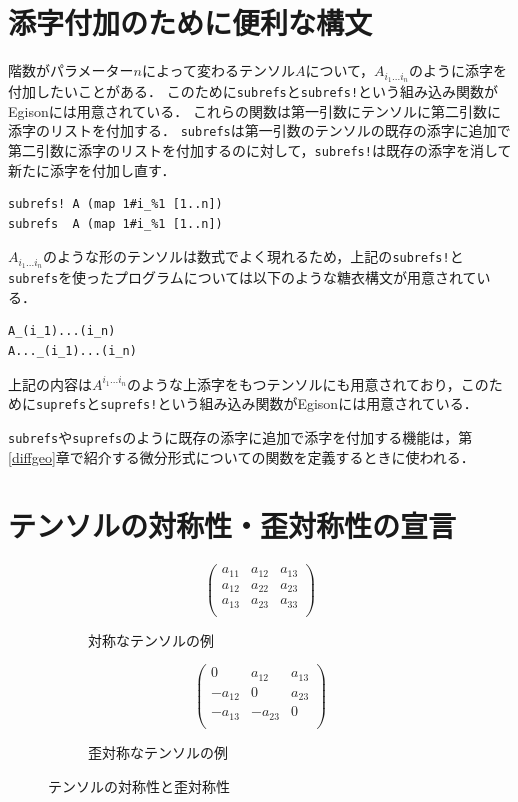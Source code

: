 \section{添字付加のために便利な構文}\label{tensor-refs}

階数がパラメーター$n$によって変わるテンソル$A$について，$A_{i_{1}...i_{n}}$のように添字を付加したいことがある．
このために\lstinline{subrefs}と\lstinline{subrefs!}という組み込み関数がEgisonには用意されている．
これらの関数は第一引数にテンソルに第二引数に添字のリストを付加する．
\lstinline{subrefs}は第一引数のテンソルの既存の添字に追加で第二引数に添字のリストを付加するのに対して，\lstinline{subrefs!}は既存の添字を消して新たに添字を付加し直す．
\begin{lstlisting}[language=egison,numbers=none]
subrefs! A (map 1#i_%1 [1..n])
subrefs  A (map 1#i_%1 [1..n])
\end{lstlisting}
$A_{i_{1}...i_{n}}$のような形のテンソルは数式でよく現れるため，上記の\lstinline{subrefs!}と\lstinline{subrefs}を使ったプログラムについては以下のような糖衣構文が用意されている．
\begin{lstlisting}[language=egison,numbers=none]
A_(i_1)...(i_n)
A..._(i_1)...(i_n)
\end{lstlisting}
上記の内容は$A^{i_{1}...i_{n}}$のような上添字をもつテンソルにも用意されており，このために\lstinline{suprefs}と\lstinline{suprefs!}という組み込み関数がEgisonには用意されている．

\lstinline{subrefs}や\lstinline{suprefs}のように既存の添字に追加で添字を付加する機能は，第\ref{diffgeo}章で紹介する微分形式についての関数を定義するときに使われる．

\section{テンソルの対称性・歪対称性の宣言}\label{tensor-symm}

\begin{figure}[t]
 \begin{subfigure}[b]{1.0\linewidth}
$$
\begin{pmatrix}
a_{11} & a_{12} & a_{13} \\
a_{12} & a_{22} & a_{23} \\
a_{13} & a_{23} & a_{33} \\
\end{pmatrix}
$$
  \caption{対称なテンソルの例}
  \label{fig:symmtensor}
 \end{subfigure}
  \medskip
 \begin{subfigure}[b]{1.0\linewidth}
$$
\begin{pmatrix}
0 & a_{12} & a_{13} \\
-a_{12} & 0 & a_{23} \\
-a_{13} & -a_{23} & 0 \\
\end{pmatrix}
$$
  \caption{歪対称なテンソルの例}
  \label{fig:antisymmtensor}
 \end{subfigure}
 \caption{テンソルの対称性と歪対称性}
 \label{fig:symm}
\end{figure}


